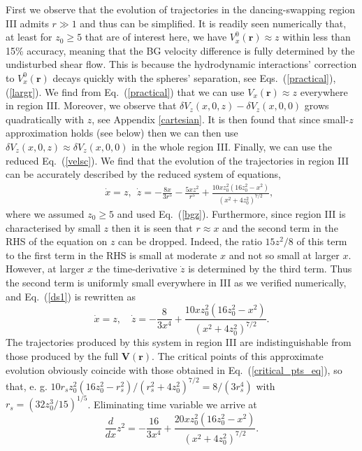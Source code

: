 First we observe that the evolution of trajectories in the dancing-swapping region III admits $r\gg 1$ and thus can be simplified. It is readily seen numerically that, at least for $z_0\geq 5$ that are of interest here, we have $V^0_x(\bm r)\approx z$ within less than 15\% accuracy, meaning that the BG velocity difference is fully determined by the undisturbed shear flow. This is because the hydrodynamic interactions' correction to $V^0_x(\bm r)$ decays quickly with the spheres' separation, see Eqs.~(\ref{practical}), (\ref{largr}). We find from Eq.~(\ref{practical}) that we can use $V_x(\bm r)\approx z$ everywhere in region III. Moreover, we observe that $\delta V_z(x, 0, z)-\delta V_z(x, 0, 0)$ grows quadratically with $z$, see Appendix \ref{cartesian}. It is then found that since small-$z$ approximation holds (see below) then we can then use $\delta V_z(x, 0, z)\approx \delta V_z(x, 0, 0)$ in the whole region III. Finally, we can use the reduced Eq.~(\ref{velsc}). We find that the evolution of the trajectories in region III can be accurately described by the reduced system of equations,
\begin{eqnarray}&&\!\!\!\!\!\!\!\!\!\!\!\!\!\!\!\!
\dot x=z,\ \ \dot z=-\frac{8x }{3r^5}\!-\!\frac{5 xz^2}{r^5}+\frac{10x z_0^2(16z_0^2\!-\!x^2)}{(x^2+4z_0^2)^{7/2}},
\label{ds1}
\end{eqnarray}
where we assumed $z_0\geq 5$ and used Eq.~(\ref{bgz}). Furthermore, since region III is characterised by small $z$ then it is seen that $r\approx x$ and the second term in the RHS of the equation on $z$ can be dropped. Indeed, the ratio $15 z^2/8$ of this term to the first term in the RHS is small at moderate $x$ and not so small at larger $x$. However, at larger $x$ the time-derivative $\dot z$ is determined by the third term. Thus the second term is uniformly small everywhere in III as we verified numerically, and Eq.~(\ref{ds1}) is rewritten as
\begin{equation}
\dot x = z,
\quad
\dot z=-\frac{8}{3x^4}+
\frac{10x z_0^2(16z_0^2-x^2)}{(x^2+4z_0^2)^{7/2}}.
\label{ds2}
\end{equation}
The trajectories produced by this system in region III are indistinguishable from those produced by the full $\bm V(\bm r)$. The critical points of this approximate evolution obviously coincide with those obtained in Eq.~(\ref{critical_pts_eq}), so that, e. g. $10r_s z_0^2(16z_0^2-r_s^2)/(r_s^2+4z_0^2)^{7/2}=8/(3r_s^4)$ with $r_s= \left(32 z_0^3/15\right)^{1/5}$. Eliminating time variable we arrive at
\begin{equation}
\frac{d}{dx}z^2=-\frac{16}{3x^4}+
\frac{20x z_0^2(16z_0^2-x^2)}{(x^2+4z_0^2)^{7/2}}.
\label{ds3}
\end{equation}
